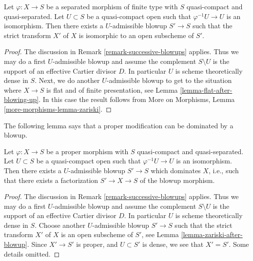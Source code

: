 \begin{lemma}
\label{lemma-zariski-after-blowup}
Let $\varphi : X \to S$ be a separated morphism of finite type with
$S$ quasi-compact and quasi-separated. Let $U \subset S$ be a
quasi-compact open such that $\varphi^{-1}U \to U$ is an isomorphism.
Then there exists a $U$-admissible blowup $S' \to S$ such that
the strict transform $X'$ of $X$ is isomorphic to an open subscheme
of $S'$.
\end{lemma}

\begin{proof}
The discussion in Remark \ref{remark-successive-blowups} applies.
Thus we may do a first $U$-admissible blowup and assume the complement
$S \setminus U$ is the support of an effective Cartier divisor $D$.
In particular $U$ is scheme theoretically dense in $S$.
Next, we do another $U$-admissible blowup to get to the situation where
$X \to S$ is flat and of finite presentation, see
Lemma \ref{lemma-flat-after-blowing-up}.
In this case the result follows from
More on Morphisms, Lemma \ref{more-morphisms-lemma-zariski}.
\end{proof}

\noindent
The following lemma says that a proper modification can be dominated
by a blowup.

\begin{lemma}
\label{lemma-dominate-proper-modification-by-blowup}
Let $\varphi : X \to S$ be a proper morphism with
$S$ quasi-compact and quasi-separated. Let $U \subset S$ be a
quasi-compact open such that $\varphi^{-1}U \to U$ is an isomorphism.
Then there exists a $U$-admissible blowup $S' \to S$
which dominates $X$, i.e., such that there exists a factorization
$S' \to X \to S$ of the blowup morphism.
\end{lemma}

\begin{proof}
The discussion in Remark \ref{remark-successive-blowups} applies.
Thus we may do a first $U$-admissible blowup and assume the complement
$S \setminus U$ is the support of an effective Cartier divisor $D$.
In particular $U$ is scheme theoretically dense in $S$.
Choose another $U$-admissible blowup $S' \to S$ such that the strict
transform $X'$ of $X$ is an open subscheme of $S'$, see
Lemma \ref{lemma-zariski-after-blowup}.
Since $X' \to S'$ is proper, and
$U \subset S'$ is dense, we see that $X' = S'$. Some details omitted.
\end{proof}






















